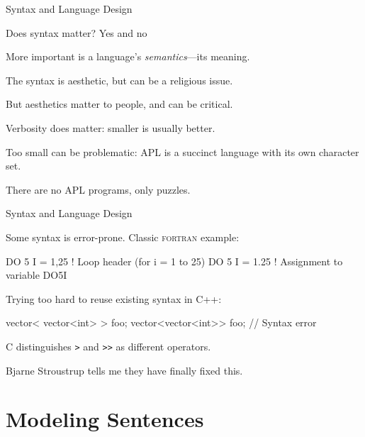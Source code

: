 \documentclass{plt}
\begin{document}
\begin{frame}[fragile]{Syntax and Language Design}

Does syntax matter?  Yes and no

More important is a language's \emph{semantics}---its meaning.

The syntax is aesthetic, but can be a religious issue.

But aesthetics matter to people, and can be critical.

Verbosity does matter: smaller is usually better.

Too small can be problematic: APL is a succinct language with its
own character set.

There are no APL programs, only puzzles.

\end{frame}

\begin{frame}[fragile]{Syntax and Language Design}

Some syntax is error-prone.  Classic \textsc{fortran} example:

\begin{fortran}
DO 5 I = 1,25  ! Loop header (for i = 1 to 25)
DO 5 I = 1.25  ! Assignment to variable DO5I
\end{fortran}

Trying too hard to reuse existing syntax in C++:

\begin{cpp}
vector< vector<int> > foo;
vector<vector<int>> foo; // Syntax error
\end{cpp}

C distinguishes \verb|>| and \verb|>>| as different operators.

Bjarne Stroustrup tells me they have finally fixed this.

\end{frame}

\part{Modeling Sentences}
\end{document}
